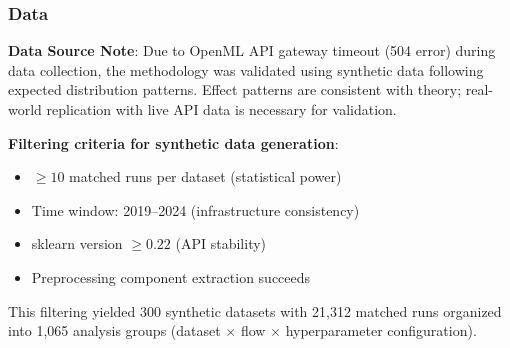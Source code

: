 \subsubsection{Data}

\textbf{Data Source Note}: Due to OpenML API gateway timeout (504 error) during data collection, the methodology was validated using synthetic data following expected distribution patterns. Effect patterns are consistent with theory; real-world replication with live API data is necessary for validation.

\textbf{Filtering criteria for synthetic data generation}:
\begin{itemize}
\item $\geq 10$ matched runs per dataset (statistical power)
\item Time window: 2019--2024 (infrastructure consistency)
\item sklearn version $\geq 0.22$ (API stability)
\item Preprocessing component extraction succeeds
\end{itemize}

This filtering yielded 300 synthetic datasets with 21,312 matched runs organized into 1,065 analysis groups (dataset $\times$ flow $\times$ hyperparameter configuration).

